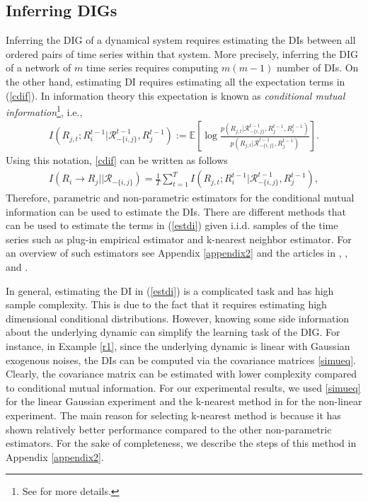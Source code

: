 \subsection{Inferring  DIGs}
Inferring the DIG of a dynamical system requires estimating the DIs between all ordered pairs of time series within that system. More precisely, inferring the DIG of a network of $m$ time series requires computing $m(m-1)$ number of DIs. 
On the other hand, estimating DI  requires estimating all the expectation terms in (\ref{cdif}).
In information theory this expectation is known as \textit{conditional mutual information}\footnote{See \citet{cover2012elements} for more details.}, i.e., 
\begin{align}
    I(R_{j,t};R_{i}^{t-1}|\mathcal{R}^{t-1}_{-\{i,j\}},R^{t-1}_{j}):=\mathbb{E}\left[\log\frac{p(R_{j,t}|\mathcal{R}^{t-1}_{-\{i,j\}},R_{j}^{t-1},R_{i}^{t-1})}{p(R_{j,t}|\mathcal{R}^{t-1}_{-\{i,j\}},R_{j}^{t-1})}\right].
\end{align}
Using this notation, \eqref{cdif} can be written as follows 
\begin{align}\label{estdi}
I(R_i\rightarrow R_j||\mathcal{R}_{-\{i,j\}})=\frac{1}{T}\sum_{t=1}^T I(R_{j,t};R_{i}^{t-1}|\mathcal{R}^{t-1}_{-\{i,j\}},R^{t-1}_{j}),
\end{align}
Therefore, parametric and non-parametric estimators for the conditional mutual information can be used to estimate the DIs. 
There are different methods that can be used to estimate the terms in (\ref{estdi}) given i.i.d. samples of the time series such as plug-in empirical estimator and k-nearest neighbor estimator. For an overview of such estimators see Appendix \ref{appendix2} and the articles in \citet{paninski2003estimation}, \citet{noshad2019scalable}, and \citet{jiao2013universal}. 
 
 
 In general, estimating the DI in (\ref{estdi}) is a complicated task and has high sample complexity.
 This is due to the fact that it requires estimating high dimensional conditional distributions. 
However, knowing some side information about the underlying dynamic can simplify the learning task of the DIG. 
For instance, in Example \ref{r1}, since the underlying dynamic is linear with Gaussian exogenous noises, the DIs can be computed via the covariance matrices \eqref{simueq}. 
Clearly, the covariance matrix can be estimated with lower complexity compared to conditional mutual information. 
For our experimental results, we used \eqref{simueq} for the linear Gaussian experiment and  the k-nearest method in \citet{sricharan2011k} for the non-linear experiment. 
The main reason for selecting k-nearest method is because it has shown relatively better performance compared to the other non-parametric estimators. 
For the sake of completeness, we describe the steps of this method in Appendix \ref{appendix2}.

